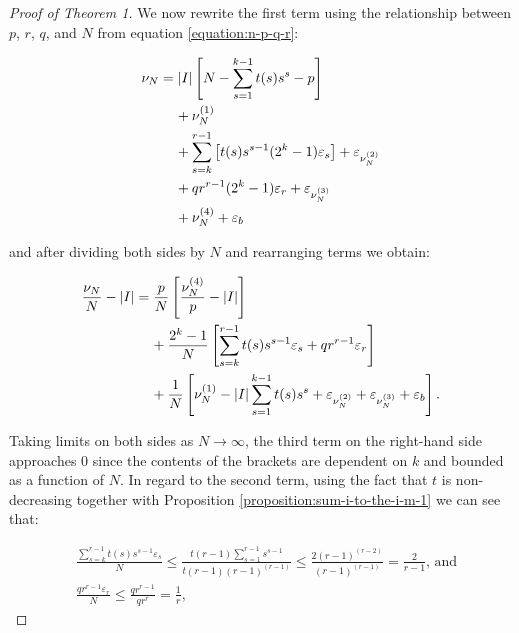 \documentclass[11pt,a4paper]{tesis}
\theoremstyle{plain}
\theoremstyle{definition}
\begin{document}
\begin{proof}[Proof of Theorem 1]
  We now rewrite the first term using the relationship between $p$, $r$, $q$, and $N$ from equation \ref{equation:n-p-q-r}:

  \begin{equation*}
    \begin{aligned}
      \nu_N
        & = |I| \left[ N - \sum_{s = 1}^{k - 1} t(s) s^s - p \right] \\
        & \hspace*{4mm} + \nu^{(1)}_N \\
        & \hspace*{4mm} + \sum_{s = k}^{r - 1} \left[ t(s) s^{s - 1} (2^k - 1) \varepsilon_s \right] + \varepsilon_{\nu^{(2)}_N} \\
        & \hspace*{4mm} + q r^{r - 1} (2^k - 1) \varepsilon_r  + \varepsilon_{\nu^{(3)}_N} \\
        & \hspace*{4mm} + \nu^{(4)}_N + \varepsilon_b
    \end{aligned}
  \end{equation*}

  and after dividing both sides by $N$ and rearranging terms we obtain:

  \begin{equation*}
    \begin{aligned}
      \frac{\nu_N}{N} - |I|
        & = \frac{p}{N} \left[ \frac{\nu^{(4)}_N}{p} - |I| \right] \\
        & \hspace*{4mm} + \frac{2^k - 1}{N} \left[ \sum_{s = k}^{r - 1} t(s) s^{s - 1} \varepsilon_s + q r^{r - 1} \varepsilon_r \right] \\
        & \hspace*{4mm} + \frac{1}{N} \left[ \nu^{(1)}_N - |I| \sum_{s = 1}^{k - 1} t(s) s^s + \varepsilon_{\nu^{(2)}_N} + \varepsilon_{\nu^{(3)}_N} + \varepsilon_b \right] \text{.}
    \end{aligned}
  \end{equation*}

  Taking limits on both sides as $N \to \infty$, the third term on the right-hand side approaches $0$ since the contents of the brackets are dependent on $k$ and bounded as a function of $N$. In regard to the second term, using the fact that $t$ is non-decreasing together with Proposition \ref{proposition:sum-i-to-the-i-m-1} we can see that:

  \begin{equation*}
    \begin{aligned}
      & \frac{\sum\limits_{s = k}^{r - 1} t(s) s^{s - 1} \varepsilon_s}{N} \le \frac{t(r - 1) \sum\limits_{s = 1}^{r - 1} s^{s - 1}}{t(r - 1) (r - 1)^{(r - 1)}} \le \frac{2 (r - 1)^{(r - 2)}}{(r - 1)^{(r - 1)}} = \frac{2}{r - 1} \text{, and} \\
      & \frac{q r^{r - 1} \varepsilon_r}{N} \le \frac{q r^{r - 1}}{q r^r} = \frac{1}{r} \text{,}
    \end{aligned}
  \end{equation*}


\end{proof}
\end{document}
